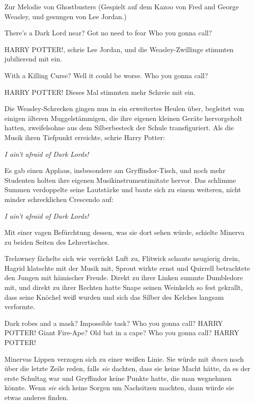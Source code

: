 \grqq{}Zur Melodie von \glqq Ghostbusters\grqq{} (Gespielt auf dem Kazoo von
Fred and George Weasley, und gesungen von Lee Jordan.)

There's a Dark Lord near? Got no need to fear Who you gonna call?

\glqq HARRY POTTER!\grqq{}, schrie Lee Jordan, und die Weasley-Zwillinge
stimmten jubilierend mit ein.

With a Killing Curse? Well it could be worse. Who you gonna call?

\glqq HARRY POTTER!\grqq{} Dieses Mal stimmten mehr Schreie mit ein.

Die Weasley-Schrecken gingen nun in ein erweitertes Heulen über, begleitet von
einigen älteren Muggelstämmigen, die ihre eigenen kleinen Geräte hervorgeholt
hatten, zweifelsohne aus dem Silberbesteck der Schule transfiguriert. Als die
Musik ihren Tiefpunkt erreichte, schrie Harry Potter:

\emph{I ain’t afraid of Dark Lords!}

Es gab einen Applaus, insbesondere am Gryffindor-Tisch, und noch mehr Studenten
holten ihre eigenen Musikinstrumentimitate hervor. Das schlimme Summen
verdoppelte seine Lautstärke und baute sich zu einem weiteren, nicht minder
schrecklichen Crescendo auf:

\emph{I ain’t afraid of Dark Lords!}

Mit einer vagen Befürchtung dessen, was sie dort sehen würde, schielte Minerva
zu beiden Seiten des Lehrertisches.

Trelawney fächelte sich wie verrückt Luft zu, Flitwick schaute neugierig drein,
Hagrid klatschte mit der Musik mit, Sprout wirkte ernst und Quirrell betrachtete
den Jungen mit hämischer Freude. Direkt zu ihrer Linken summte Dumbledore mit,
und direkt zu ihrer Rechten hatte Snape seinen Weinkelch so fest gekrallt, dass
seine Knöchel weiß wurden und sich das Silber des Kelches langsam verformte.

\grqq{}Dark robes and a mask? Impossible task? Who you gonna call? HARRY POTTER!
Giant Fire-Ape? Old bat in a cape? Who you gonna call? HARRY POTTER!

Minervas Lippen verzogen sich zu einer weißen Linie. Sie würde mit \emph{ihnen}
noch über die letzte Zeile reden, falls \emph{sie} dachten, dass sie keine Macht
hätte, da es der erste Schultag war und Gryffindor keine Punkte hatte, die man
wegnehmen könnte. Wenn \emph{sie} sich keine Sorgen um Nachsitzen machten, dann
würde sie etwas anderes finden.

